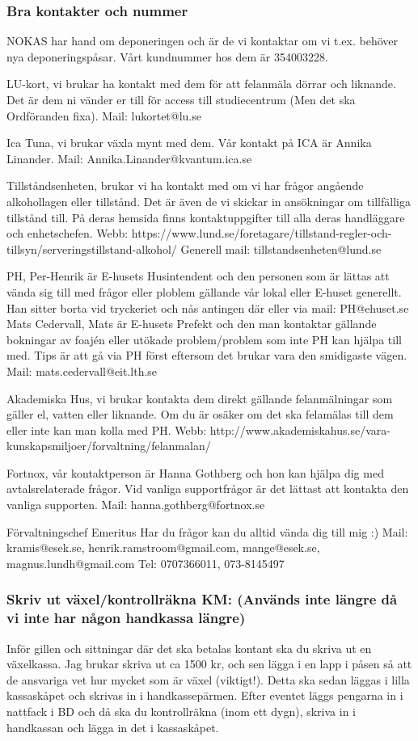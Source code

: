 \documentclass[10pt]{article}
\begin{document}
\subsubsection{Bra kontakter och nummer}
NOKAS har hand om deponeringen och är de vi kontaktar om vi t.ex. behöver nya deponeringspåsar. Vårt kundnummer hos dem är 354003228.

LU-kort, vi brukar ha kontakt med dem för att felanmäla dörrar och liknande. Det är dem ni vänder er till för access till studiecentrum (Men det ska Ordföranden fixa).
Mail: lukortet@lu.se

Ica Tuna, vi brukar växla mynt med dem.
Vår kontakt på ICA är Annika Linander. Mail: Annika.Linander@kvantum.ica.se

Tillståndsenheten, brukar vi ha kontakt med om vi har frågor angående alkohollagen eller tillstånd. Det är även de vi skickar in ansökningar om tillfälliga tillstånd till. På deras hemsida finns kontaktuppgifter till alla deras handläggare och enhetschefen.
Webb: https://www.lund.se/foretagare/tillstand-regler-och-tillsyn/serveringstillstand-alkohol/
Generell mail: tillstandsenheten@lund.se

PH, Per-Henrik är E-husets Husintendent och den personen som är lättas att vända sig till
med frågor eller ploblem gällande vår lokal eller E-huset generellt.
Han sitter borta vid tryckeriet och nås antingen där eller via mail: PH@ehuset.se
Mats Cedervall, Mats är E-husets Prefekt och den man kontaktar gällande bokningar av foajén eller utökade problem/problem som inte PH kan hjälpa till med. Tips är att gå via PH först eftersom det brukar vara den smidigaste vägen.
Mail: mats.cedervall@eit.lth.se

Akademiska Hus, vi brukar kontakta dem direkt gällande felanmälningar som gäller el, vatten eller liknande. Om du är osäker om det ska felamälas till dem eller inte kan man kolla med PH.
Webb: http://www.akademiskahus.se/vara-kunskapsmiljoer/forvaltning/felanmalan/

Fortnox, vår kontaktperson är Hanna Gothberg och hon kan hjälpa dig med avtalsrelaterade frågor. Vid vanliga supportfrågor är det lättast att kontakta den vanliga supporten.
Mail: hanna.gothberg@fortnox.se 

Förvaltningschef Emeritus
Har du frågor kan du alltid vända dig till mig :)
Mail: kramis@esek.se, henrik.ramstroom@gmail.com, mange@esek.se, magnus.lundh@gmail.com
Tel: 0707366011, 073-8145497

\subsubsection{Skriv ut växel/kontrollräkna KM: (Används inte längre då vi inte har någon handkassa längre)}
Inför gillen och sittningar där det ska betalas kontant ska du skriva ut en växelkassa. Jag brukar skriva ut ca 1500 kr, och sen lägga i en lapp i påsen så att de ansvariga vet hur mycket som är växel (viktigt!). Detta ska sedan läggas i lilla kassaskåpet och skrivas in i handkassepärmen. Efter eventet läggs pengarna in i nattfack i BD och då ska du kontrollräkna (inom ett dygn), skriva in i handkassan och lägga in det i kassaskåpet.
\end{document}
